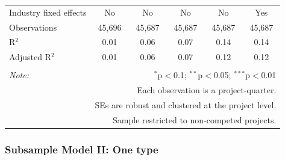 \documentclass[
]{article}
\begin{document}
\begin{table}[H]
\begin{tabular}{@{\extracolsep{-2pt}}lccccc}
Industry fixed effects & No & No & No & No & Yes \\ 
Observations & 45,696 & 45,687 & 45,687 & 45,687 & 45,687 \\ 
R$^{2}$ & 0.01 & 0.06 & 0.07 & 0.14 & 0.14 \\ 
Adjusted R$^{2}$ & 0.01 & 0.06 & 0.07 & 0.12 & 0.12 \\ 
\hline 
\hline \\[-1.8ex] 
\textit{Note:}  & \multicolumn{5}{r}{$^{*}$p$<$0.1; $^{**}$p$<$0.05; $^{***}$p$<$0.01} \\ 
 & \multicolumn{5}{r}{Each observation is a project-quarter.} \\ 
 & \multicolumn{5}{r}{SEs are robust and clustered at the project level.} \\ 
 & \multicolumn{5}{r}{Sample restricted to non-competed projects.} \\ 
\end{tabular} 
\end{table}

\hypertarget{subsample-model-ii-one-type}{%
\subsubsection{Subsample Model II: One
type}\label{subsample-model-ii-one-type}}
\end{document}
